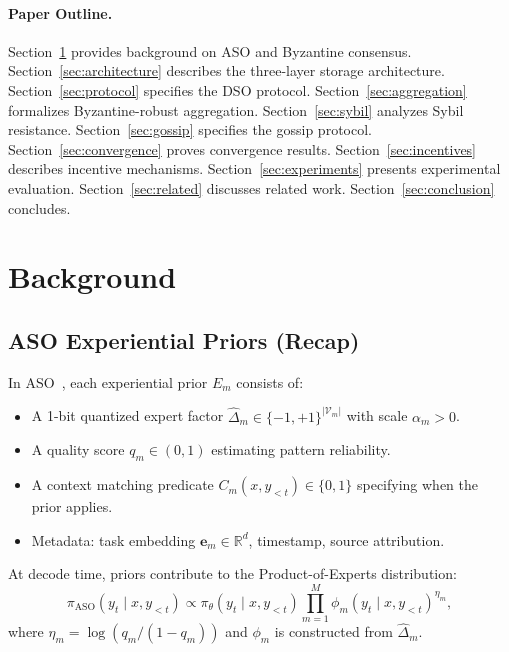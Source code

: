 \documentclass[11pt]{article}
\begin{document}
\paragraph{Paper Outline.}
Section~\ref{sec:background} provides background on ASO and Byzantine consensus.
Section~\ref{sec:architecture} describes the three-layer storage architecture.
Section~\ref{sec:protocol} specifies the DSO protocol.
Section~\ref{sec:aggregation} formalizes Byzantine-robust aggregation.
Section~\ref{sec:sybil} analyzes Sybil resistance.
Section~\ref{sec:gossip} specifies the gossip protocol.
Section~\ref{sec:convergence} proves convergence results.
Section~\ref{sec:incentives} describes incentive mechanisms.
Section~\ref{sec:experiments} presents experimental evaluation.
Section~\ref{sec:related} discusses related work.
Section~\ref{sec:conclusion} concludes.

\section{Background}
\label{sec:background}

\subsection{ASO Experiential Priors (Recap)}

In ASO~\cite{hanzo2026aso}, each experiential prior $E_m$ consists of:
\begin{itemize}[leftmargin=1.5em]
    \item A 1-bit quantized expert factor $\widehat{\Delta}_m \in \{-1, +1\}^{|\mathcal{V}_m|}$
          with scale $\alpha_m > 0$.
    \item A quality score $q_m \in (0, 1)$ estimating pattern reliability.
    \item A context matching predicate $C_m(x, y_{<t}) \in \{0, 1\}$ specifying
          when the prior applies.
    \item Metadata: task embedding $\bm{e}_m \in \mathbb{R}^d$, timestamp,
          source attribution.
\end{itemize}

At decode time, priors contribute to the Product-of-Experts distribution:
\begin{equation}
    \pi_{\text{ASO}}(y_t \mid x, y_{<t}) \propto \pi_\theta(y_t \mid x, y_{<t})
    \prod_{m=1}^{M} \phi_m(y_t \mid x, y_{<t})^{\eta_m},
    \label{eq:poe-recap}
\end{equation}
where $\eta_m = \log(q_m / (1 - q_m))$ and $\phi_m$ is constructed from
$\widehat{\Delta}_m$.
\end{document}
